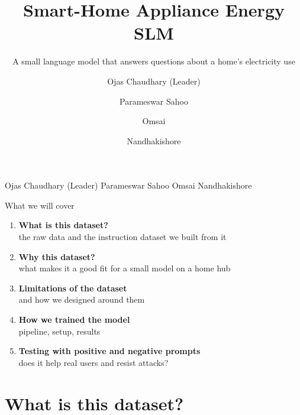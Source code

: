 \documentclass[aspectratio=169,11pt]{beamer}
\title{Smart-Home Appliance Energy SLM}
\subtitle{A small language model that answers questions about a home's electricity use}
\author{Ojas Chaudhary (Leader) \and Parameswar Sahoo \and Omsai \and Nandhakishore}
\institute{Design Thinking Project}
\date{}
\newcommand{\hl}[1]{{\color{brand}\textbf{#1}}}
\begin{document}
\begin{frame}[plain]
  \vfill
  {\color{ink}\inserttitle\par}
  \vspace{0.3em}{\color{brand}\rule{3cm}{3pt}}\par\vspace{0.8em}
  {\large\color{ink2}\insertsubtitle\par}
  \vspace{2em}
  {\small Ojas Chaudhary (Leader) \textperiodcentered{} Parameswar Sahoo \textperiodcentered{} Omsai \textperiodcentered{} Nandhakishore\par}
  \vfill
\end{frame}

\begin{frame}{What we will cover}
  \begin{enumerate}\setlength{\itemsep}{0.5em}\large
    \item \hl{What is this dataset?}\\{\normalsize\color{ink2}the raw data and the instruction dataset we built from it}
    \item \hl{Why this dataset?}\\{\normalsize\color{ink2}what makes it a good fit for a small model on a home hub}
    \item \hl{Limitations of the dataset}\\{\normalsize\color{ink2}and how we designed around them}
    \item \hl{How we trained the model}\\{\normalsize\color{ink2}pipeline, setup, results}
    \item \hl{Testing with positive and negative prompts}\\{\normalsize\color{ink2}does it help real users and resist attacks?}
  \end{enumerate}
\end{frame}

\section{What is this dataset?}
\end{document}
